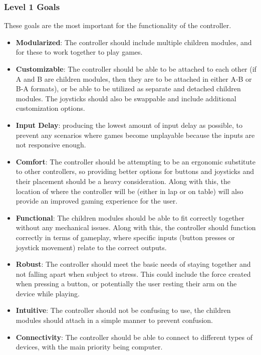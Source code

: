 \documentclass[a4]{article}
\begin{document}
\subsubsection{Level 1 Goals}
These goals are the most important for the functionality of the controller.
\begin{itemize}
    \item \textcolor{McMasterMaroon}{\textbf{Modularized}}: The controller should include multiple children modules, and for these to work together to play games.
    \item \textcolor{McMasterMaroon}{\textbf{Customizable}}: The controller should be able to be attached to each other (if A and B are children modules, then they are to be attached in either A-B or B-A formats), or be able to be utilized as separate and detached children modules.
        The joysticks should also be swappable and include additional customization options.
    \item \textcolor{McMasterMaroon}{\textbf{Input Delay}}: producing the lowest amount of input delay as possible, to prevent any scenarios where games become unplayable because the inputs are not responsive enough.
    \item \textcolor{McMasterMaroon}{\textbf{Comfort}}: The controller should be attempting to be an ergonomic substitute to other controllers, so providing better options for buttons and joysticks and their placement should be a heavy consideration. 
        Along with this, the location of where the controller will be (either in lap or on table) will also provide an improved gaming experience for the user.
    \item \textcolor{McMasterMaroon}{\textbf{Functional}}: The children modules should be able to fit correctly together without any mechanical issues. Along with this, the controller should function correctly in terms of gameplay, where specific inputs (button presses or joystick movement) relate to the correct outputs.
    \item \textcolor{McMasterMaroon}{\textbf{Robust}}: The controller should meet the basic needs of staying together and not falling apart when subject to stress. This could include the force created when pressing a button, or potentially the user resting their arm on the device while playing.
    \item \textcolor{McMasterMaroon}{\textbf{Intuitive}}: The controller should not be confusing to use, the children modules should attach in a simple manner to prevent confusion.
    \item \textcolor{McMasterMaroon}{\textbf{Connectivity}}: The controller should be able to connect to different types of devices, with the main priority being computer.   
\end{itemize}
\end{document}
